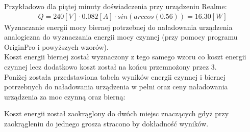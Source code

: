 \documentclass[11pt]{article}
\begin{document}
    \noindent Przykładowo dla piątej minuty doświadczenia przy urządzeniu Realme:
    \begin{gather*}
        Q=240[V]\cdot 0.082[A]\cdot sin(arccos(0.56))=16.30[W]
    \end{gather*}
    \indent Wyznaczanie energii mocy biernej potrzebnej do naładowania urządzenia analogiczna do wyznaczania energii mocy czynnej (przy pomocy programu OriginPro i powyższych wzorów).\\
    \indent Koszt energii biernej został wyznaczony z tego samego wzoru co koszt energii czynnej lecz dodatkowo koszt został na końcu przemnożony przez 3.\\
    Poniżej została przedstawiona tabela wyników energii czynnej i biernej potrzebnych do naładowania urządzenia w pełni oraz ceny naładowania urządzenia za moc czynną oraz bierną:
    \begin{center}
    \end{center}
    \indent Koszt energii został zaokrąglony do dwóch miejsc znaczących gdyż przy zaokrągleniu do jednego grosza stracono by dokładność wyników.
    \newpage
\end{document}
